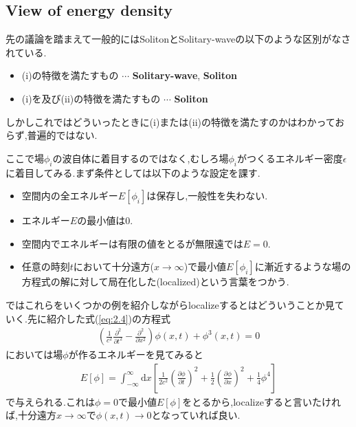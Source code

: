 \documentclass[dvipdfmx,11pt,a4paper]{jsbook}
\begin{document}
\subsection{View of energy density}
先の議論を踏まえて一般的にはSolitonとSolitary-waveの以下のような区別がなされている.
\begin{screen}
    \begin{itemize}
        \item (i)の特徴を満たすもの $\cdots$ {\bf Solitary-wave}, {\bf Soliton}
        \item (i)を及び(ii)の特徴を満たすもの $\cdots$ {\bf Soliton}
    \end{itemize}
\end{screen}

しかしこれではどういったときに(i)または(ii)の特徴を満たすのかはわかっておらず,普遍的ではない.

ここで場$\phi_i$の波自体に着目するのではなく,むしろ場$\phi_i$がつくるエネルギー密度$\epsilon$に着目してみる.まず条件としては以下のような設定を課す.
\begin{itemize}
    \item 空間内の全エネルギー$E[\phi_i]$は保存し,一般性を失わない.
    \item エネルギー$E$の最小値は0.
    \item 空間内でエネルギーは有限の値をとるが無限遠では$E=0$.
    \item 任意の時刻$t$において十分遠方($x\rightarrow \infty$)で最小値$E[\phi_i]$に漸近するような場の方程式の解に対して局在化した(localized)という言葉をつかう.
\end{itemize}
ではこれらをいくつかの例を紹介しながらlocalizeするとはどういうことか見ていく.先に紹介した式(\ref{eq:2.4})の方程式
\begin{align*}
    \left(\frac{1}{c^{2}} \frac{\partial^{2}}{\partial t^{2}}-\frac{\partial^{2}}{\partial x^{2}}\right) \phi(x, t)+\phi^{3}(x, t)=0
\end{align*}
においては場$\phi$が作るエネルギーを見てみると
\begin{align}
    E[\phi]=\int_{-\infty}^{\infty} \mathrm{d} x\left[\frac{1}{2 c^{2}}\left(\frac{\partial \phi}{\partial t}\right)^{2}+\frac{1}{2}\left(\frac{\partial \phi}{\partial x}\right)^{2}+\frac{1}{4} \phi^{4}\right]
\end{align}
で与えられる.これは$\phi=0$で最小値$E[\phi]$をとるから,localizeすると言いたければ,十分遠方$x\rightarrow \infty$で$\phi(x,t)\rightarrow 0$となっていれば良い.\\
\end{document}
